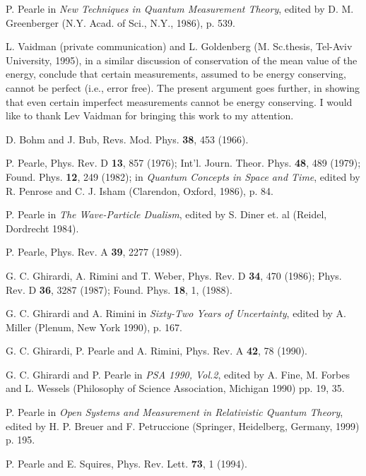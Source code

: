 \documentclass[12pt]{article}
\begin{document}
\begin{thebibliography}{99}

P. Pearle in {\it New Techniques in Quantum Measurement Theory}, 
edited by D. M. Greenberger (N.Y. Acad. of Sci., N.Y., 1986), p. 539.

L. Vaidman (private communication) and L. Goldenberg (M. Sc.thesis, Tel-Aviv University, 1995),   
in a similar discussion of conservation of the mean value of the energy, conclude that 
certain measurements, assumed to be energy conserving, cannot be 
perfect (i.e., error free). The present argument 
goes further, in showing that even certain imperfect measurements cannot be energy conserving.  I would like 
to thank Lev Vaidman for bringing this work to my attention.    

D. Bohm and J. Bub, Revs. Mod. Phys. {\bf 38}, 453 (1966).

P. Pearle, Phys. Rev. D {\bf 13}, 857 (1976); 
Int'l. Journ. Theor. Phys. {\bf 48}, 489 (1979); Found. Phys. {\bf 12}, 249 (1982);
in {\it Quantum Concepts in Space and Time}, edited by R. Penrose and C. J. 
Isham (Clarendon, Oxford, 1986), p. 84.
 
 P. Pearle in 
{\it The Wave-Particle Dualism}, edited by S. Diner et. al (Reidel, Dordrecht 1984).

P. Pearle, Phys. Rev. A {\bf 39}, 2277 (1989).

 G. C. Ghirardi, A. Rimini and T. Weber, Phys. Rev. D {\bf 34}, 470 (1986); 
Phys. Rev. D {\bf 36}, 3287 (1987); Found. Phys. {\bf 18}, 1, (1988).

G. C. Ghirardi and A. Rimini in {\it Sixty-Two Years of Uncertainty}, 
edited by A. Miller (Plenum, New  York 1990), p. 167.

G. C. Ghirardi, P. Pearle and A. Rimini, Phys. Rev. A {\bf 42}, 78 (1990).

G. C. Ghirardi and P. Pearle in {\it PSA 1990, Vol.2}, edited by A. Fine, M. Forbes and 
L. Wessels (Philosophy of Science Association, Michigan 1990) pp. 19, 35. 

P. Pearle in {\it Open Systems and Measurement in Relativistic Quantum Theory}, 
 edited by H. P. Breuer and F. Petruccione (Springer, Heidelberg, Germany, 1999) p. 195.
   
P. Pearle and E. Squires, Phys. Rev. Lett. {\bf 73}, 1 (1994).


\end{thebibliography}
\end{document}
